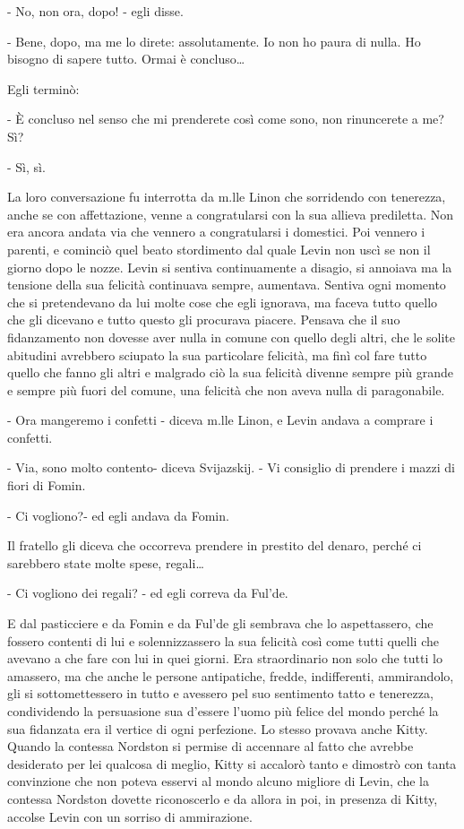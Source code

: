 - No, non ora, dopo! - egli disse. 

- Bene, dopo, ma me lo direte: assolutamente. Io non ho paura di nulla. Ho bisogno di sapere tutto. Ormai è concluso\ldots{} 

Egli terminò: 

- È concluso nel senso che mi prenderete così come sono, non rinuncerete a me? Sì? 

- Sì, sì. 

La loro conversazione fu interrotta da m.lle Linon che sorridendo con tenerezza, anche se con affettazione, venne a congratularsi con la sua allieva prediletta. Non era ancora andata via che vennero a congratularsi i domestici. Poi vennero i parenti, e cominciò quel beato stordimento dal quale Levin non uscì se non il giorno dopo le nozze. Levin si sentiva continuamente a disagio, si annoiava ma la tensione della sua felicità continuava sempre, aumentava. Sentiva ogni momento che si pretendevano da lui molte cose che egli ignorava, ma faceva tutto quello che gli dicevano e tutto questo gli procurava piacere. Pensava che il suo fidanzamento non dovesse aver nulla in comune con quello degli altri, che le solite abitudini avrebbero sciupato la sua particolare felicità, ma finì col fare tutto quello che fanno gli altri e malgrado ciò la sua felicità divenne sempre più grande e sempre più fuori del comune, una felicità che non aveva nulla di paragonabile. 

- Ora mangeremo i confetti - diceva m.lle Linon, e Levin andava a comprare i confetti. 

- Via, sono molto contento- diceva Svijazskij. - Vi consiglio di prendere i mazzi di fiori di Fomin. 

- Ci vogliono?- ed egli andava da Fomin. 

Il fratello gli diceva che occorreva prendere in prestito del denaro, perché ci sarebbero state molte spese, regali\ldots{} 

- Ci vogliono dei regali? - ed egli correva da Ful'de. 

E dal pasticciere e da Fomin e da Ful'de gli sembrava che lo aspettassero, che fossero contenti di lui e solennizzassero la sua felicità così come tutti quelli che avevano a che fare con lui in quei giorni. Era straordinario non solo che tutti lo amassero, ma che anche le persone antipatiche, fredde, indifferenti, ammirandolo, gli si sottomettessero in tutto e avessero pel suo sentimento tatto e tenerezza, condividendo la persuasione sua d'essere l'uomo più felice del mondo perché la sua fidanzata era il vertice di ogni perfezione. Lo stesso provava anche Kitty. Quando la contessa Nordston si permise di accennare al fatto che avrebbe desiderato per lei qualcosa di meglio, Kitty si accalorò tanto e dimostrò con tanta convinzione che non poteva esservi al mondo alcuno migliore di Levin, che la contessa Nordston dovette riconoscerlo e da allora in poi, in presenza di Kitty, accolse Levin con un sorriso di ammirazione. 

